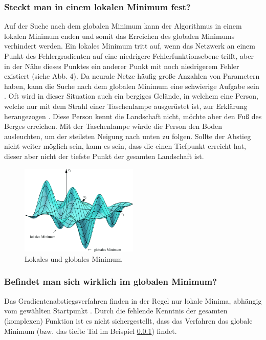 \subsubsection{Steckt man in einem lokalen Minimum fest?}\label{subsec:gradientenverfahren:fehlerquellen_lokalen_minimum}
  Auf der Suche nach dem globalen Minimum kann der Algorithmus in einem lokalen Minimum enden und somit das Erreichen des globalen Minimums verhindert werden.
  Ein lokales Minimum tritt auf, wenn das Netzwerk an einem Punkt des Fehlergradienten auf eine niedrigere Fehlerfunktionsebene trifft, aber in der Nähe dieses Punktes ein anderer Punkt mit noch niedrigerem Fehler existiert (siehe Abb. 4).
  Da neurale Netze häufig große Anzahlen von Parametern haben, kann die Suche nach dem globalen Minimum eine schwierige Aufgabe sein \cite{HS97}.
  Oft wird in dieser Situation auch ein bergiges Gelände, in welchem eine Person, welche nur mit dem Strahl einer Taschenlampe ausgerüstet ist, zur Erklärung herangezogen \cite{TR17}.
  Diese Person kennt die Landschaft nicht, möchte aber den Fuß des Berges erreichen. Mit der Taschenlampe würde die Person den Boden ausleuchten, um der steilsten Neigung nach unten zu folgen.
  Sollte der Abstieg nicht weiter möglich sein, kann es sein, dass die einen Tiefpunkt erreicht hat, dieser aber nicht der tiefste Punkt der gesamten Landschaft ist.
  \\
  \begin{figure}[ht]
    \centering
    \includegraphics[width=0.5\textwidth]{Sources/03-3.3.2_3-dimensionaler_abstieg.png}
    \caption{Lokales und globales Minimum \cite{SP18}}
    \label{subsec:lokale-globale-minima}
    
\end{figure}

\subsubsection{Befindet man sich wirklich im globalen Minimum?}\label{subsec:gradientenverfahren:fehlerquellen_globalen_minimum}
  Das Gradientenabstiegsverfahren finden in der Regel nur lokale Minima, abhängig vom gewählten Startpunkt \cite{HS97}.
  Durch die fehlende Kenntnis der gesamten (komplexen) Funktion ist es nicht sichergestellt, dass das Verfahren das globale Minimum (bzw. das tiefte Tal im Beispiel \ref*{subsec:gradientenverfahren:fehlerquellen_lokalen_minimum}) findet.


